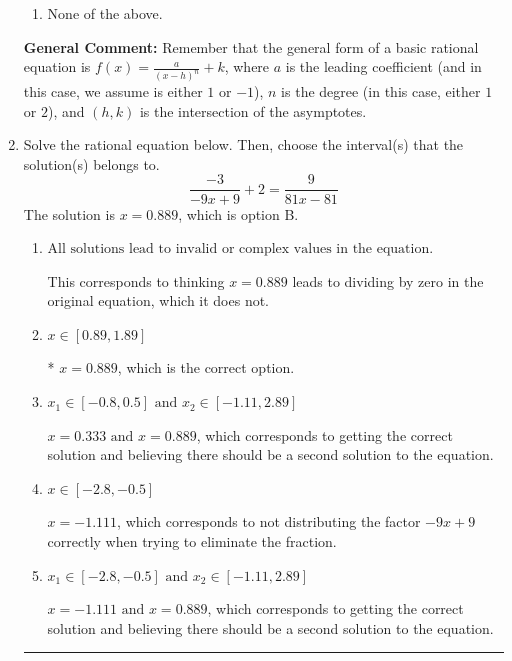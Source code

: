 \documentclass{extbook}[14pt]
\newcommand{\litem}[1]{\item #1

\rule{\textwidth}{0.4pt}}
\begin{document}
\begin{enumerate}
{\begin{enumerate}[label=\Alph*.]
\begin{multicols}{2}
\end{multicols}\item None of the above.\end{enumerate}
\textbf{General Comment:} Remember that the general form of a basic rational equation is $ f(x) = \frac{a}{(x-h)^n} + k$, where $a$ is the leading coefficient (and in this case, we assume is either $1$ or $-1$), $n$ is the degree (in this case, either $1$ or $2$), and $(h, k)$ is the intersection of the asymptotes.
}
\litem{
Solve the rational equation below. Then, choose the interval(s) that the solution(s) belongs to.
\[ \frac{-3}{-9x + 9} + 2 = \frac{9}{81x -81} \]The solution is \( x = 0.889 \), which is option B.\begin{enumerate}[label=\Alph*.]
\item \( \text{All solutions lead to invalid or complex values in the equation.} \)

This corresponds to thinking $x = 0.889$ leads to dividing by zero in the original equation, which it does not.
\item \( x \in [0.89,1.89] \)

* $x = 0.889$, which is the correct option.
\item \( x_1 \in [-0.8, 0.5] \text{ and } x_2 \in [-1.11,2.89] \)

$x = 0.333 \text{ and } x = 0.889$, which corresponds to getting the correct solution and believing there should be a second solution to the equation.
\item \( x \in [-2.8,-0.5] \)

$x = -1.111$, which corresponds to not distributing the factor $-9x + 9$ correctly when trying to eliminate the fraction.
\item \( x_1 \in [-2.8, -0.5] \text{ and } x_2 \in [-1.11,2.89] \)

$x = -1.111 \text{ and } x = 0.889$, which corresponds to getting the correct solution and believing there should be a second solution to the equation.
\end{enumerate}

}
\end{enumerate}
\end{document}
